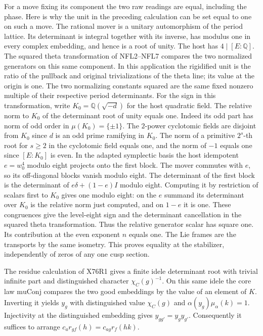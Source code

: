 For a move fixing its component the two raw readings are equal,
including the phase. Here is why the unit in the preceding
calculation can be set equal to one on such a move. The rational
mover is a unitary automorphism of the period lattice. Its
determinant is integral together with its inverse, has modulus
one in every complex embedding, and hence is a root of unity.
The host has $4\mid[E:\mathbb Q]$. The squared theta transformation
of NFL2--NFL7 compares the two normalized generators on this
same component. In this application the rigidified unit is
the ratio of the pullback and original trivializations of the
theta line; its value at the origin is one. The two normalizing
constants squared are the same fixed nonzero multiple of their
respective period determinants. For the sign in this
transformation, write $K_0=\mathbb Q(\sqrt{-d})$ for the host
quadratic field. The relative norm to $K_0$ of the determinant
root of unity equals one. Indeed its odd part has norm of odd
order in $\mu(K_0)=\{\pm1\}$. The $2$-power cyclotomic fields
are disjoint from $K_0$ since $d$ is an odd prime ramifying in
$K_0$. The norm of a primitive $2^s$-th root for $s\ge2$ in the
cyclotomic field equals one, and the norm of $-1$ equals one
since $[E:K_0]$ is even. In the adapted symplectic basis the
host idempotent $e=w_0^4$ modulo eight projects onto the first
block. The mover commutes with $e$, so its off-diagonal blocks
vanish modulo eight. The determinant of the first block is the
determinant of $e\delta+(1-e)I$ modulo eight. Computing it by
restriction of scalars first to $K_0$ gives one modulo eight:
on the $e$ summand its determinant over $K_0$ is the relative
norm just computed, and on $1-e$ it is one. These congruences
give the level-eight sign and the determinant cancellation in
the squared theta transformation.
Thus the relative generator scalar has square one. Its contribution
at the even exponent $n$ equals one. The Lie frames are the
transports by the same isometry. This proves equality at the
stabilizer, independently of zeros of any one cusp section.

The residue calculation of X76R1 gives a finite idele determinant
root with trivial infinite part and distinguished character
$\chi_C(g)^{-1}$. On this same idele the core law
$\mathrm{muConj}$ compares the two good embeddings by the value of
an element of $K$. Inverting it yields $y_g$ with distinguished
value $\chi_C(g)$ and $\alpha(y_g)\mu_\alpha(k)=1$.
Injectivity at the distinguished embedding gives $y_{gg'}=y_gy_{g'}$.
Consequently it suffices to arrange $c_a r_{gf}(h)=c_{ag}r_f(hk)$.

